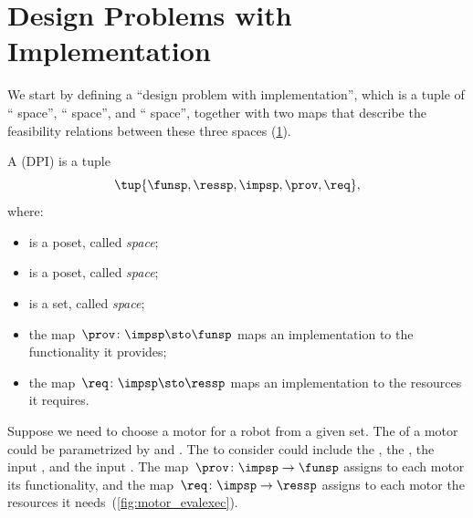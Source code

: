 
\section[DPIs]{Design Problems with Implementation}
\label{sec:Design-Problems}
We start by defining a ``design problem with implementation'', which is a tuple of `` space'', `` space'', and `` space'', together with two maps that describe the feasibility relations between these three spaces (\cref{fig:setup}).

\begin{definition}
    \label{def:DPI}
    A  (DPI) is a tuple
    \begin{equation}
        \tup{\funsp, \ressp, \impsp, \prov, \req},
    \end{equation}
    where:
    \begin{itemize}
        \item \funsp is a poset, called \emph{ space};
        \item \ressp is a poset, called \emph{ space};
        \item \impsp is a set, called \emph{ space};
        \item the map~$\prov\colon\impsp\sto\funsp$
              maps an implementation to the functionality it provides;
        \item the map~$\req\colon\impsp\sto\ressp$
              maps an implementation to the resources it requires.
    \end{itemize}

\end{definition}

\begin{figure}[h!]
    \centering
    \caption{}
    \label{fig:setup}
\end{figure}

\begin{example}
    \label{exa:motor}
    Suppose we need to choose a motor for a robot from a given set.
    The  of a motor could be parametrized by  and .
    The  to consider could include the \R{\unit[cost]{[USD]}}, the \R{\unit[mass]{[g]}}, the input \R{\unit[voltage]{[V]}}, and the input \R{\unit[current]{[A]}}.
    The map~$\prov \colon \impsp\to\funsp$ assigns to each motor its functionality, and the map~$\req \colon \impsp\rightarrow\ressp$ assigns to each motor the resources it needs~(\cref{fig:motor_evalexec}).
\end{example}

